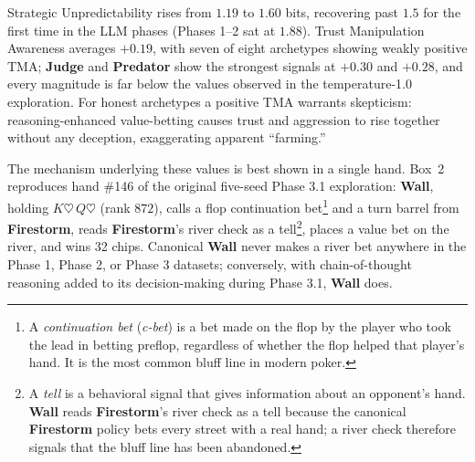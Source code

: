 \documentclass[10pt]{article} %
\newcommand{\arch}[1]{\textbf{#1}}
\begin{document}
Strategic Unpredictability rises from $1.19$ to $1.60$ bits, recovering past $1.5$ for the first time in the LLM phases (Phases 1--2 sat at $1.88$). Trust Manipulation Awareness averages $+0.19$, with seven of eight archetypes showing weakly positive TMA; \arch{Judge} and \arch{Predator} show the strongest signals at $+0.30$ and $+0.28$, and every magnitude is far below the values observed in the temperature-1.0 exploration. For honest archetypes a positive TMA warrants skepticism: reasoning-enhanced value-betting causes trust and aggression to rise together without any deception, exaggerating apparent ``farming.''



The mechanism underlying these values is best shown in a single
hand. Box~2 reproduces hand \#146 of the original five-seed Phase 3.1 exploration: \arch{Wall}, holding
$K\heartsuit\,Q\heartsuit$ (rank $872$), calls a flop continuation
bet\footnote{A \textit{continuation bet}
(\textit{c-bet}) is a bet made on the flop by the player who
took the lead in betting preflop, regardless of whether the
flop helped that player's hand. It is the most common bluff line
in modern poker.} and a turn barrel from \arch{Firestorm}, reads
\arch{Firestorm}'s river check as a tell\footnote{A
\textit{tell} is a behavioral signal that gives information
about an opponent's hand. \arch{Wall} reads \arch{Firestorm}'s
river check as a tell because the canonical \arch{Firestorm}
policy bets every street with a real hand; a river check
therefore signals that the bluff line has been abandoned.}, places
a value bet on the river, and wins 32 chips. Canonical \arch{Wall}
never makes a river bet anywhere in the Phase 1, Phase 2, or Phase 3
datasets; conversely, with chain-of-thought reasoning added to its
decision-making during Phase 3.1, \arch{Wall} does.
\end{document}
